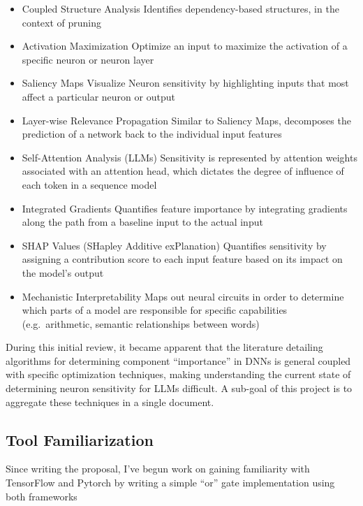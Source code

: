 \documentclass{article}
\begin{document}
    \begin{itemize}
        \item Coupled Structure Analysis
        \subitem Identifies dependency-based structures, in the context of pruning~\cite{ma2023llm}
        \item Activation Maximization
        \subitem Optimize an input to maximize the activation of a specific neuron or neuron layer
        \item Saliency Maps
        \subitem Visualize Neuron sensitivity by highlighting inputs that most affect a particular neuron or output~\cite{hsu2023explainable}
        \item Layer-wise Relevance Propagation
        \subitem Similar to Saliency Maps, decomposes the prediction of a network back to the individual input features~\cite{jia2022interpreting}
        \item Self-Attention Analysis (LLMs)
        \subitem Sensitivity is represented by attention weights associated with an attention head, which dictates the degree of influence of each token in a sequence model~\cite{shi2021sparsebert}
        \item Integrated Gradients
        \subitem Quantifies feature importance by integrating gradients along the path from a baseline input to the actual input~\cite{sundararajan2017axiomatic}
        \item SHAP Values (SHapley Additive exPlanation)
        \subitem Quantifies sensitivity by assigning a contribution score to each input feature based on its impact on the model’s output~\cite{nohara2022explanation}
        \item Mechanistic Interpretability
        \subitem Maps out neural circuits in order to determine which parts of a model are responsible for specific capabilities (e.g.\ arithmetic, semantic relationships between words)~\cite{singh2024rethinking}
    \end{itemize}

    During this initial review, it became apparent that the literature detailing algorithms for determining component
    ``importance'' in DNNs is general coupled with specific optimization techniques, making understanding the current state
    of determining neuron sensitivity for LLMs difficult.
    A sub-goal of this project is to aggregate these techniques in a single document.

    \subsection*{Tool Familiarization}
    Since writing the proposal, I've begun work on gaining familiarity with TensorFlow\cite{tensorflow_2024} and
    Pytorch\cite{pytorch_2024} by writing a simple ``or'' gate implementation using both frameworks\cite{seely_tensorflow_2024}
\end{document}
